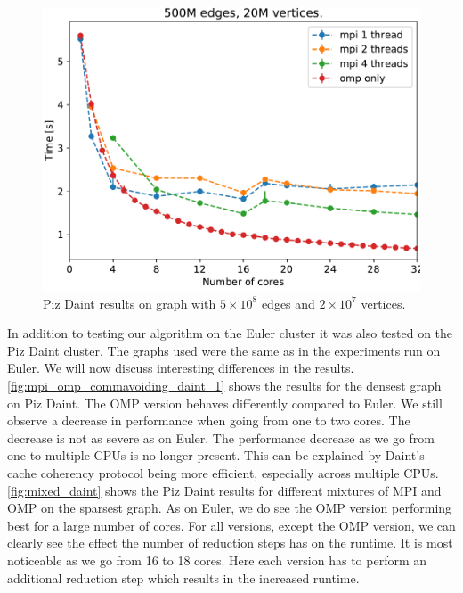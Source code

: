 \begin{figure}
\includegraphics[width=\fsize]{data/all_vertices_without_commavoid_20M.pdf}
\caption{Piz Daint results on graph with $5\times10^8$ edges and $2\times10^7$ vertices.}
\label{fig:mixed_daint}
\end{figure}

 {In addition to testing our algorithm on the Euler cluster it was also tested on the Piz Daint cluster}. The graphs used were the same as in the experiments run on Euler. We will now discuss interesting differences in the results.\\
\autoref{fig:mpi_omp_commavoiding_daint_1} shows the results for the densest graph on Piz Daint. The OMP  version behaves differently compared to Euler. We still observe a decrease in performance when going from one to two cores. The decrease is not as severe as on Euler. The performance decrease as we go from one to multiple CPUs is no longer present. This can be explained by Daint's cache coherency protocol being more efficient, especially across multiple CPUs.
\autoref{fig:mixed_daint} shows the Piz Daint results for different mixtures of MPI and OMP on the sparsest graph. As on Euler, we do see the OMP  version performing best for a large number of cores. For all versions, except the OMP  version, we can clearly see the effect the number of reduction steps has on the runtime. It is most noticeable as we go from 16 to 18 cores. Here each version has to perform an additional reduction step which results in the increased runtime.





